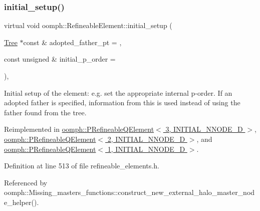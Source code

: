 \subsubsection{\texorpdfstring{initial\+\_\+setup()}{initial\_setup()}}
{\footnotesize\ttfamily virtual void oomph\+::\+Refineable\+Element\+::initial\+\_\+setup (\begin{DoxyParamCaption}\item[{\hyperlink{classoomph_1_1Tree}{Tree} $\ast$const \&}]{adopted\+\_\+father\+\_\+pt = {},  }\item[{const unsigned \&}]{initial\+\_\+p\+\_\+order = {} }\end{DoxyParamCaption})\hspace{0.3cm}{\ttfamily [inline]}, {\ttfamily [virtual]}}



Initial setup of the element\+: e.\+g. set the appropriate internal p-\/order. If an adopted father is specified, information from this is used instead of using the father found from the tree. 



Reimplemented in \hyperlink{classoomph_1_1PRefineableQElement_3_013_00_01INITIAL__NNODE__1D_01_4_a46ecfac0c9c6f00bd70d8cacf8afc395}{oomph\+::\+P\+Refineable\+Q\+Element$<$ 3, I\+N\+I\+T\+I\+A\+L\+\_\+\+N\+N\+O\+D\+E\+\_\+D $>$}, \hyperlink{classoomph_1_1PRefineableQElement_3_012_00_01INITIAL__NNODE__1D_01_4_a8f5e49dc263238c79f8f924fdb6d035d}{oomph\+::\+P\+Refineable\+Q\+Element$<$ 2, I\+N\+I\+T\+I\+A\+L\+\_\+\+N\+N\+O\+D\+E\+\_\+D $>$}, and \hyperlink{classoomph_1_1PRefineableQElement_3_011_00_01INITIAL__NNODE__1D_01_4_a630acfb3aa4851428f80c53be78346fd}{oomph\+::\+P\+Refineable\+Q\+Element$<$ 1, I\+N\+I\+T\+I\+A\+L\+\_\+\+N\+N\+O\+D\+E\+\_\+D $>$}.



Definition at line 513 of file refineable\+\_\+elements.\+h.



Referenced by oomph\+::\+Missing\+\_\+masters\+\_\+functions\+::construct\+\_\+new\+\_\+external\+\_\+halo\+\_\+master\+\_\+node\+\_\+helper().

\mbox{\label{classoomph_1_1RefineableElement_a8ca420443c28708e5c6315a80f520137}} 
